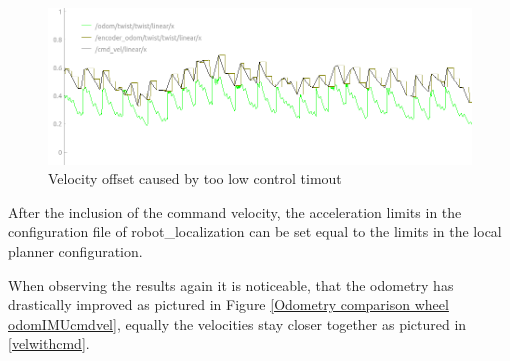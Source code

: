 \begin{figure}[H]
	\includegraphics[width=\textwidth]{Pictures/velocity comp}
	\caption{Velocity offset caused by too low control timout}
	\label{velocity offset}

\end{figure}

After the inclusion of the command velocity, the acceleration limits in the configuration file of robot\_localization can be set equal to the limits in the local planner configuration.

When observing the results again it is noticeable, that the odometry has drastically improved as pictured in Figure \ref{Odometry comparison wheel odomIMUcmdvel}, equally the velocities stay closer together as pictured in \ref{velwithcmd}.

